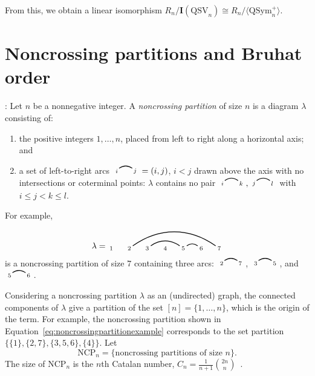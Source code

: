 \documentclass[submission]{FPSAC2024}
\theoremstyle{definition}
\theoremstyle{remark}
\numberwithin{equation}{section}
\newcommand{\QSym}{\mathrm{QSym}}
\newcommand{\QSV}{\mathrm{QSV}}
\newcommand{\NCP}{\mathrm{NCP}}
\newcommand{\edge}[2]{\tikz[scale = 0.75, baseline = -0.2cm]{
\draw (0.1, 0) node[inner sep = 0ex] (a) {};
\node[left, xshift = 0.1cm, yshift = -0.1cm] at (a) {$\scriptstyle #1$};
\draw (0.9, 0)  node[inner sep = 0ex] (b) {};
\node[right, xshift = -0.1cm, yshift = -0.1cm] at (b) {$\scriptstyle #2$};
\draw[thick] (a) to[out = 35, in = 145] (b);}}
\begin{document}
From this, we obtain a linear isomorphism
$R_{n}\big/\mathbf{I}(\QSV_{n}) \cong R_{n}\big/\langle \QSym_{n}^{+} \rangle.$

\section{Noncrossing partitions and Bruhat order}
\label{sec:ncp}


\medskip{}:
Let $n$ be a nonnegative integer.  A \emph{noncrossing partition} of size $n$ is a diagram $\lambda$ consisting of:
\begin{enumerate}[itemsep = -.5ex]
\item the positive integers $1, \ldots, n$, placed from left to right along a horizontal axis; and

\item a set of left-to-right arcs $\edge{i}{j} = (i, j)$, $i < j$ drawn above the axis with no intersections or coterminal points: $\lambda$ contains no pair $\edge{i}{k}, \edge{j}{l}$ with $i \le j < k \le l$.

\end{enumerate}
For example,
\begin{equation}
\label{eq:noncrossingpartitionexample}
\lambda = \begin{tikzpicture}[scale = 0.75, baseline = 0.75*-0.2]
\foreach \x in {1, ..., 7}{\draw[fill] (\x - 1, 0) node[inner sep = 2pt] (\x) {$\scriptstyle \x$};}
\foreach \i\j in {5/6, 3/5,2/7}{\draw[thick] (\i) to[out = 35, in = 145] (\j);}
\end{tikzpicture}
\end{equation}
is a noncrossing partition of size $7$ containing three arcs: $\edge{2}{7}$, $\edge{3}{5}$, and $\edge{5}{6}$.

Considering a noncrossing partition $\lambda$ as an (undirected) graph, the connected components of $\lambda$ give a partition of the set $[n] = \{1, \ldots, n\}$, which is the origin of the term.  For example, the noncrossing partition shown in Equation~\eqref{eq:noncrossingpartitionexample} corresponds to the set partition $\big\{ \{1\}, \{2, 7\}, \{3, 5, 6\}, \{4\}  \big\}$.  Let
\[
\NCP_{n} = \{ \text{noncrossing partitions of size $n$} \}.
\]
The size of $\NCP_{n}$ is the $n$th Catalan number, $C_{n} = \frac{1}{n+1}\binom{2n}{n}$~\cite{S99}.
\end{document}
